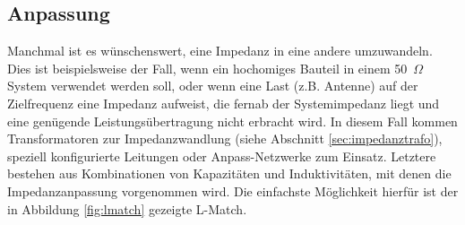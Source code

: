 \documentclass[twoside,a4paper,11pt,halfparskip,DIV=11,notitlepage]{scrartcl}
\begin{document}
\subsection{Anpassung}
Manchmal ist es wünschenswert, eine Impedanz in eine andere umzuwandeln. Dies ist beispielsweise der Fall,
wenn ein hochomiges Bauteil in einem 50~$\Omega$ System verwendet werden soll, oder wenn eine Last
(z.B. Antenne) auf der Zielfrequenz eine Impedanz aufweist, die fernab der Systemimpedanz liegt und eine
genügende Leistungsübertragung nicht erbracht wird. In diesem Fall kommen Transformatoren zur Impedanzwandlung
(siehe Abschnitt \ref{sec:impedanztrafo}), speziell konfigurierte Leitungen
oder Anpass-Netzwerke zum Einsatz. Letztere bestehen aus Kombinationen von Kapazitäten und Induktivitäten,
mit denen die Impedanzanpassung vorgenommen wird. Die einfachste Möglichkeit hierfür ist der in Abbildung
\ref{fig:lmatch} gezeigte L-Match.
\end{document}

